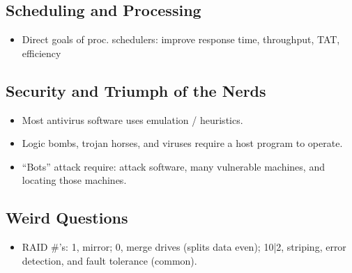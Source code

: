 \documentclass[fontsize=4.5pt]{scrartcl}
\begin{document}
\begin{multicols}{3}
    \subsection{Scheduling and Processing}
      \begin{itemize}
        \item Direct goals of proc. schedulers: improve response time, throughput, TAT, efficiency
      \end{itemize}

    
    
    \subsection{Security and Triumph of the Nerds}
      \begin{itemize}
        \item Most antivirus software uses emulation / heuristics.
        \item Logic bombs, trojan horses, and viruses require a host program to operate.
        \item ``Bots'' attack require: attack software, many vulnerable machines, and locating those machines.
      \end{itemize}
     
     
     \subsection{Weird Questions}
       \begin{itemize}
         \item RAID \#'s: 1, mirror; 0, merge drives (splits data even); 10|2, striping, error detection, and fault tolerance (common).
       \end{itemize}




  \end{multicols}
\end{document}

